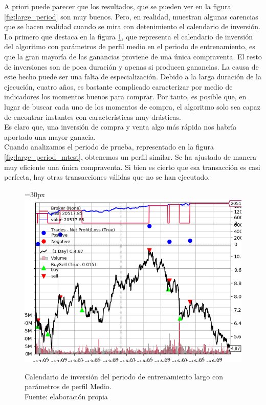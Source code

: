 A priori puede parecer que los resultados, que se pueden ver en la figura \ref{fig:large_period} son muy buenos. Pero, en realidad, muestran algunas carencias que se hacen realidad cuando se mira con detenimiento el calendario de inversi\'on.\\

Lo primero que destaca en la figura \ref{fig:large_period_mtrain}, que representa el calendario de inversi\'on del algoritmo con par\'ametros de perfil medio en el periodo de entrenamiento, es que la gran mayor\'ia de las ganancias proviene de una \'unica compraventa. El resto de inversiones son de poca duraci\'on y apenas si producen ganancias. La causa de este hecho puede ser una falta de especializaci\'on. Debido a la larga duraci\'on de la ejecuci\'on, cuatro a\~nos, es bastante complicado caracterizar por medio de indicadores los momentos buenos para comprar. Por tanto, es posible que, en lugar de buscar cada uno de los momentos de compra, el algoritmo solo sea capaz de encontrar instantes con caracter\'isticas muy dr\'asticas.\\

Es claro que, una inversi\'on de compra y venta algo m\'as r\'apida nos habr\'ia aportado una mayor ganacia.\\

Cuando analizamos el periodo de prueba, representado en la figura \ref{fig:large_period_mtest}, obtenemos un perfil similar. Se ha ajustado de manera muy eficiente una \'unica compraventa. Si bien es cierto que esa transacci\'on es casi perfecta, hay otras transacciones v\'alidas que no se han ejecutado.\\

     	\begin{figure}[H]
     		\centering\leftskip=30px
     		\includegraphics[scale=0.75]{imagenes/L_Medium_train.png}
     		\caption[Calendario de inversi\'on del periodo de entrenamiento largo.]{Calendario de inversi\'on del periodo de entrenamiento largo con par\'ametros de perfil Medio.\\ Fuente: elaboraci\'on propia}
     		\label{fig:large_period_mtrain}
     	\end{figure}
     	
